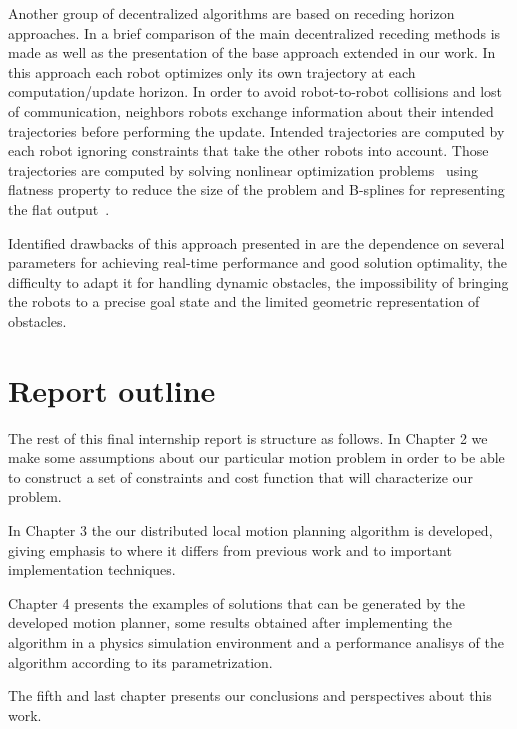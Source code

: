 Another group of decentralized algorithms are based on receding horizon approaches.
In \cite{Defoort2009} a brief comparison of the main decentralized receding 
methods is made as well as the presentation of the base approach extended in
our work.
In this approach each robot optimizes only its own 
trajectory at each computation/update horizon. In order to
avoid robot-to-robot collisions and lost of communication, neighbors robots 
exchange information about their intended trajectories before 
performing the update. Intended trajectories are computed by each robot
ignoring constraints that take the other robots into account.
Those trajectories are computed by
solving nonlinear optimization problems~\cite{betts1998survey}
using flatness property to reduce the size of the problem and B-splines for representing
the flat output~\cite{milam2003real}.

Identified drawbacks of this approach presented in \cite{Defoort2009} are the dependence on 
several parameters for achieving real-time performance and good solution 
optimality, the difficulty to adapt it for handling dynamic obstacles, the 
impossibility of bringing the robots to a precise goal state and the limited
geometric representation of obstacles.

\section{Report outline}

The rest of this final internship report is structure as follows. In Chapter 2 we make some assumptions about our particular motion problem in order to be able to construct a set of constraints and cost function that will characterize our problem.

In Chapter 3 the our distributed
local motion planning algorithm is developed, giving emphasis to where it differs from previous 
work and to important implementation techniques.

Chapter 4 presents the examples of solutions that can be generated by the developed motion planner, some results obtained after implementing the algorithm in a physics simulation environment and a performance analisys of the algorithm according to its parametrization.

The fifth and last chapter presents our conclusions and perspectives about this work.

%
%
%
%

